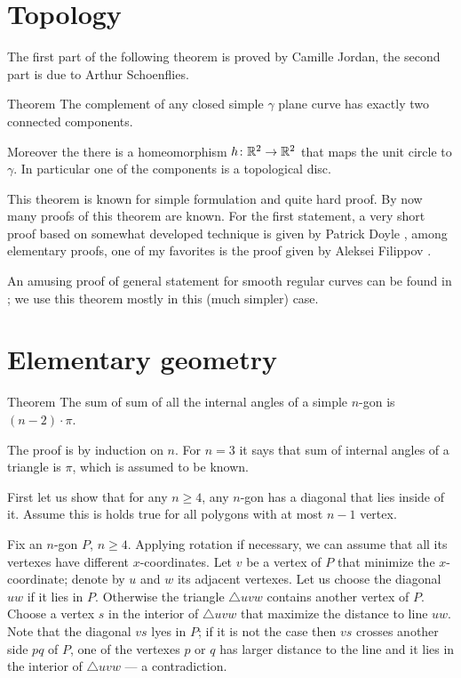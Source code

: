 \section*{Topology}

The first part of the following theorem is proved by Camille Jordan, the second part is due to Arthur Schoenflies.

\begin{thm}{Theorem}
The complement of any closed simple $\gamma$ plane curve has exactly two connected components. 

Moreover the there is a homeomorphism $h\colon\mathbb{R}^2\to \mathbb{R}^2$ that maps the unit circle to $\gamma$.
In particular one of the components is a topological disc.
\end{thm}

This theorem is known for simple formulation and quite hard proof.
By now many proofs of this theorem are known.
For the first statement, a very short proof based on somewhat developed technique is given by Patrick Doyle \cite{doyle},
among elementary proofs, one of my favorites is the proof given by Aleksei Filippov \cite{filippov}.

An amusing proof of general statement for smooth regular curves can be found in \cite{chambers-liokumovich}; we use this theorem mostly in this (much simpler) case.

\section*{Elementary geometry}

\begin{thm}{Theorem}\label{thm:sum=(n-2)pi}
The sum of sum of all the internal angles of a simple $n$-gon is $(n-2)\cdot\pi$. 
\end{thm}


The proof is by induction on $n$.
For $n=3$ it says that sum of internal angles of a triangle is $\pi$, which is assumed to be known.

First let us show that for any $n\ge4$, any $n$-gon has a diagonal that lies inside of it.
Assume this is holds true for all polygons with at most $n-1$ vertex.

Fix an $n$-gon $P$, $n\ge4$.
Applying rotation if necessary, we can assume that all its vertexes have different $x$-coordinates.
Let $v$ be a vertex of $P$ that minimize the $x$-coordinate;
denote by $u$ and $w$ its adjacent vertexes.
Let us choose the diagonal $uw$ if it lies in $P$.
Otherwise the triangle $\triangle uvw$ contains another vertex of $P$.
Choose a vertex $s$ in the interior of $\triangle uvw$ that maximize the distance to line $uw$.
Note that the diagonal $vs$ lyes in $P$;
if it is not the case then $vs$ crosses another side $pq$ of $P$, one of the vertexes $p$ or $q$ has larger distance to the line and it lies in the interior of $\triangle uvw$ --- a contradiction.

